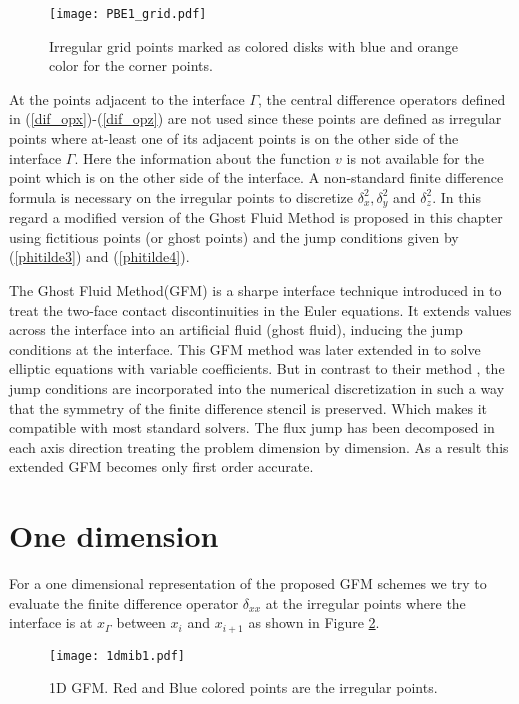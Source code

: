 \begin{figure}[H]
	\centering
	\texttt{[image: PBE1\_grid.pdf]}
	\caption{Irregular grid points marked as colored disks with blue and orange color for the corner points.}
	\label{fig_irgpoints}
\end{figure}


At the points adjacent to the interface $\Gamma$, the central difference operators defined in (\ref{dif_opx})-(\ref{dif_opz}) are not used since these points are defined as irregular points where at-least one of its adjacent points is on the other side of the interface $\Gamma$. 
Here the information about the function $v$ is not available for the point which is on the other side of the interface. A non-standard finite difference formula is necessary on the irregular points to discretize $\delta_x^2,\delta_y^2$ and $\delta_z^2$.  In this regard a modified version of the Ghost Fluid Method is proposed in this chapter using fictitious points (or ghost points) and the jump conditions given by (\ref{phitilde3}) and (\ref{phitilde4}).


The Ghost Fluid Method(GFM) is a sharpe interface technique introduced in  \cite{Fedkiw1999} to treat the two-face contact discontinuities in the Euler equations. It extends values across the interface into an artificial fluid (ghost fluid), inducing the jump conditions at the interface. This GFM method was later extended in \cite{Liu2000} to solve elliptic equations with variable coefficients. But in contrast to their method \cite{Liu2000}, the jump conditions are incorporated into the numerical discretization in such a way that the symmetry of the finite difference stencil is preserved. Which makes it compatible with most standard solvers. The flux jump has been decomposed in each axis direction treating the problem dimension by dimension. As a result this extended GFM becomes only first order accurate.   


\section{One dimension}

For a one dimensional representation of the proposed GFM schemes we try to evaluate the finite difference operator $\delta_{xx}$ at the irregular points where the interface is at $x_\Gamma$ between $x_i$ and $x_{i+1}$ as shown in Figure \ref{fig_1}.  %
\begin{figure}[t!]
\begin{center}
\texttt{[image: 1dmib1.pdf]}\hspace{10mm}
\caption{1D GFM. Red and Blue colored points are the irregular points.}
\label{fig_1}
\end{center}
\end{figure}

